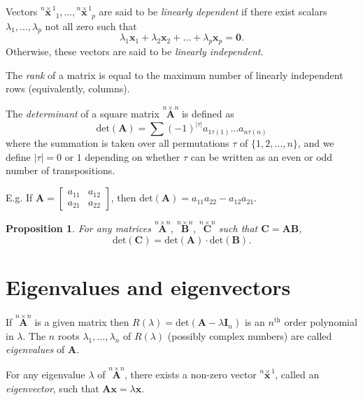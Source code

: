 \documentclass[]{book}
\newtheorem{proposition}{Proposition}[chapter]
\theoremstyle{definition}
\theoremstyle{definition}
\theoremstyle{definition}
\theoremstyle{remark}
\begin{document}
\noindent Vectors \(\stackrel{n\times 1}{\mathbf x}_1 ,\dots , \stackrel{n\times 1}{\mathbf x}_p\)
are said to be \emph{linearly dependent} if there exist scalars
\(\lambda _1, \dots ,\lambda _p\) not all zero such that
\[ \lambda _1 {\mathbf x}_1+\lambda _2 {\mathbf x}_2+ \dots + \lambda _p {\mathbf x}_p={\mathbf 0}.\]
Otherwise, these vectors are said to be \emph{linearly independent}.

The \emph{rank} of a matrix is equal to the maximum number of linearly independent rows (equivalently, columns).

The \emph{determinant} of a square matrix \(\stackrel{n\times n}{\mathbf A}\) is
defined as
\[ \text{det}({\mathbf A})=\sum (-1)^{|\tau |} a_{1\tau(1)}\dots a_{n\tau (n)} \]
where the summation is taken over all permutations \(\tau\) of \(\{1,2,\dots ,n\}\),
and we define \(|\tau |=0\) or \(1\) depending on whether \(\tau\) can be written as an even or
odd number of transpositions.

E.g. If \({\mathbf A}=\left[ \begin{array}{cc} a_{11}&a_{12}\\ a_{21}&a_{22} \end{array} \right]\),
then \(\text{det}({\mathbf A})=a_{11}a_{22}-a_{12}a_{21}\).

\begin{proposition}
\protect\hypertarget{prp:unnamed-chunk-2}{}{\label{prp:unnamed-chunk-2} }For any matrices \(\stackrel{n\times n}{\mathbf A}\),
\(\stackrel{n\times n}{\mathbf B}\), \(\stackrel{n\times n}{\mathbf C}\) such that \({\mathbf C}={\mathbf{AB}}\),
\[ \text{det}({\mathbf C})=\text{det}({\mathbf A}) \cdot \text{det}({\mathbf B}).\]
\end{proposition}

\hypertarget{eigenvalues-and-eigenvectors}{%
\section{Eigenvalues and eigenvectors}\label{eigenvalues-and-eigenvectors}}

If \(\stackrel{n\times n}{\mathbf A}\) is a given matrix then
\(R(\lambda )=\text{det}({\mathbf A}-\lambda {\mathbf I}_n)\) is an \(n^{\text{th}}\) order polynomial in \(\lambda\).
The \(n\) roots \(\lambda _1, \dots , \lambda _n\) of \(R(\lambda )\) (possibly complex
numbers) are called \emph{eigenvalues} of \(\mathbf A\).

For any eigenvalue \(\lambda\) of \(\stackrel{n\times n}{\mathbf A}\), there exists
a non-zero vector \(\stackrel{n\times 1}{\mathbf x}\), called an \emph{eigenvector}, such
that \({\mathbf A} {\mathbf x} = \lambda {\mathbf x}\).
\end{document}
